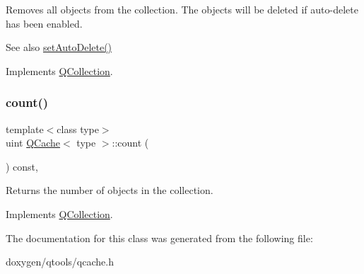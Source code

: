 Removes all objects from the collection. The objects will be deleted if auto-\/delete has been enabled. \begin{DoxySeeAlso}{See also}
\mbox{\hyperlink{class_q_collection_a6ed41913c76bfba54be6da26015ee3f3}{set\+Auto\+Delete()}} 
\end{DoxySeeAlso}


Implements \mbox{\hyperlink{class_q_collection_a92416cc22907550389aad04c26be2f77}{Q\+Collection}}.

\mbox{\label{class_q_cache_ac2f569c43cd3aeaabf28aef74a1e33b4}} 
\subsubsection{\texorpdfstring{count()}{count()}}
{\footnotesize\ttfamily template$<$class type$>$ \\
uint \mbox{\hyperlink{class_q_cache}{Q\+Cache}}$<$ type $>$\+::count (\begin{DoxyParamCaption}{ }\end{DoxyParamCaption}) const\hspace{0.3cm}{\ttfamily [inline]}, {\ttfamily [virtual]}}

Returns the number of objects in the collection. 

Implements \mbox{\hyperlink{class_q_collection_a6441adbfb3ffb6f55ed834c0c0bcc6cb}{Q\+Collection}}.



The documentation for this class was generated from the following file\+:\begin{DoxyCompactItemize}
\item 
doxygen/qtools/qcache.\+h\end{DoxyCompactItemize}
